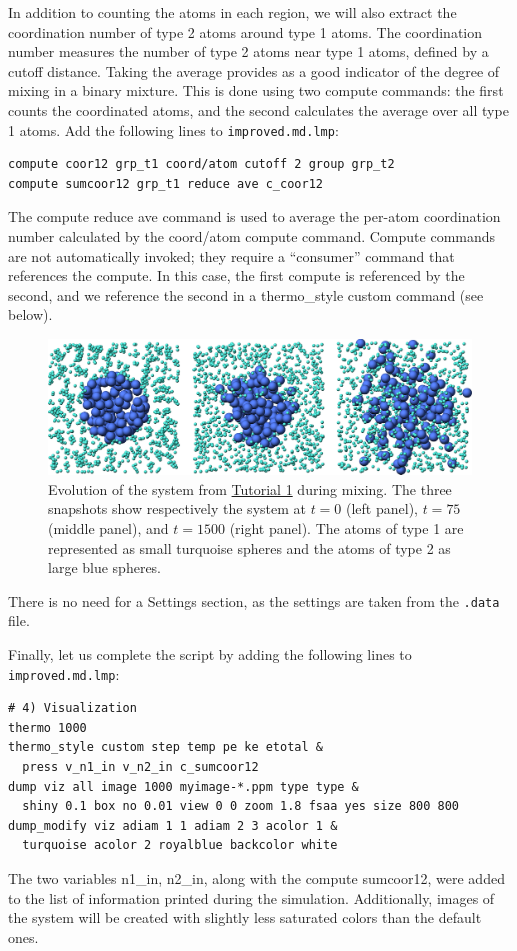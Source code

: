 \documentclass[9pt,tutorial]{livecoms}
\newcommand{\lmpcmd}[1]{\hspace{0pt}\colorbox{listing}{\textcolor{command}{\small{#1}}}\hspace{0pt}} %
\newcommand{\flecmd}[1]{\textcolor{command}{\texttt{#1}}} %
\begin{document}
In addition to counting the atoms in each region, we will also extract
the coordination number of type 2 atoms around type 1 atoms.  The
coordination number measures the number of type 2 atoms near
type 1 atoms, defined by a cutoff distance.  Taking the average provides
as a good indicator of the degree of mixing in a binary mixture.  This
is done using two \lmpcmd{compute} commands:  the first counts the
coordinated atoms, and the second calculates the average over all type 1
atoms.  Add the following lines to \flecmd{improved.md.lmp}:
\begin{lstlisting}
compute coor12 grp_t1 coord/atom cutoff 2 group grp_t2
compute sumcoor12 grp_t1 reduce ave c_coor12
\end{lstlisting}
The \lmpcmd{compute reduce ave} command is used to average the per-atom
coordination number calculated by the \lmpcmd{coord/atom}
compute command.  Compute commands are not automatically invoked; they
require a ``consumer'' command that references the compute.  In this case, the
first compute is referenced by the second, and we reference the second
in a \lmpcmd{thermo\_style custom} command (see below).

\begin{figure}
\centering
\includegraphics[width=\linewidth]{LJ-evolution}
\caption{Evolution of the system from \hyperref[lennard-jones-label]{Tutorial 1}
during mixing.  The three snapshots show respectively the system
at $t=0$ (left panel), $t=75$ (middle panel), and $t=1500$ (right panel).  The
atoms of type 1 are represented as small turquoise spheres and the atoms of type 2
as large blue spheres.}
\label{fig:evolution-population}
\end{figure}

\begin{note}
There is no need for a \lmpcmd{Settings}
section, as the settings are taken from the \flecmd{.data} file.
\end{note}

Finally, let us complete the script by adding the following lines to
\flecmd{improved.md.lmp}:
\begin{lstlisting}
# 4) Visualization
thermo 1000
thermo_style custom step temp pe ke etotal &
  press v_n1_in v_n2_in c_sumcoor12
dump viz all image 1000 myimage-*.ppm type type &
  shiny 0.1 box no 0.01 view 0 0 zoom 1.8 fsaa yes size 800 800
dump_modify viz adiam 1 1 adiam 2 3 acolor 1 &
  turquoise acolor 2 royalblue backcolor white
\end{lstlisting}
The two variables \lmpcmd{n1\_in}, \lmpcmd{n2\_in}, along with the compute
\lmpcmd{sumcoor12}, were added to the list of information printed during
the simulation.  Additionally, images of the system will be created with
slightly less saturated colors than the default ones.
\end{document}
